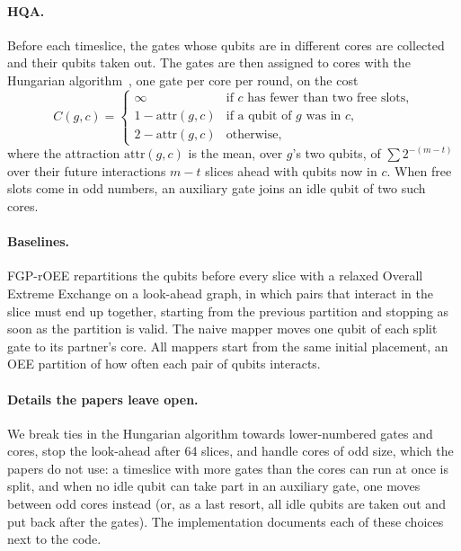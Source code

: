 \documentclass[11pt]{article}
\begin{document}
\paragraph{HQA.} Before each timeslice, the gates whose qubits are in
different cores are collected and their qubits taken out. The gates are then
assigned to cores with the Hungarian algorithm~\cite{kuhn1955hungarian}, one
gate per core per round, on the cost
\begin{equation}
  C(g, c) =
  \begin{cases}
    \infty & \text{if $c$ has fewer than two free slots,}\\
    1 - \mathrm{attr}(g, c) & \text{if a qubit of $g$ was in $c$,}\\
    2 - \mathrm{attr}(g, c) & \text{otherwise,}
  \end{cases}
\end{equation}
where the attraction $\mathrm{attr}(g, c)$ is the mean, over $g$'s two
qubits, of $\sum 2^{-(m-t)}$ over their future interactions $m - t$ slices
ahead with qubits now in $c$. When free slots come in odd numbers, an
auxiliary gate joins an idle qubit of two such cores.

\paragraph{Baselines.} FGP-rOEE repartitions the qubits before every slice
with a relaxed Overall Extreme Exchange on a look-ahead graph, in which pairs
that interact in the slice must end up together, starting from the previous
partition and stopping as soon as the partition is valid. The naive mapper moves one
qubit of each split gate to its partner's core. All mappers start from the
same initial placement, an OEE partition of how often each pair of qubits
interacts.

\paragraph{Details the papers leave open.} We break ties in the Hungarian
algorithm towards lower-numbered gates and cores, stop the look-ahead after
64 slices, and handle cores of odd size, which the papers do not use: a
timeslice with more gates than the cores can run at once is split, and when
no idle qubit can take part in an auxiliary gate, one moves between odd cores
instead (or, as a last resort, all idle qubits are taken out and put back
after the gates). The implementation documents each of these choices next to
the code.
\end{document}
